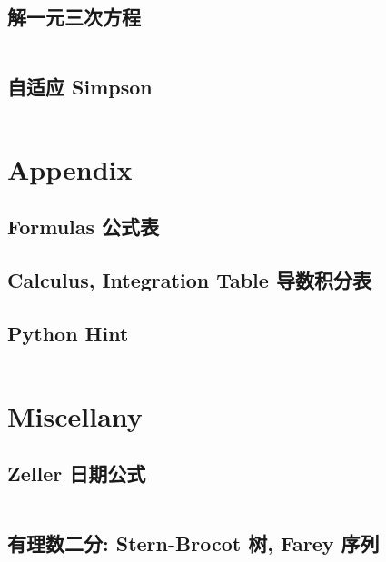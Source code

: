 \documentclass[titlepage, a4paper, 11pt]{article}
\begin{document}
\begin{spacing}{1.15}
				\subsection{解一元三次方程}
					\inputminted{cpp}{src/Math/解一元三次方程.cpp}
				\subsection{自适应 Simpson}
					\inputminted{cpp}{src/Math/Simpson.cpp}
		
			
			\section{Appendix}
				\begin{spacing}{0.4}
				\subsection{Formulas 公式表}
					
				\subsection{Calculus, Integration Table 导数积分表}
					
					
				\subsection{Python Hint}
					\inputminted{python}{src/Miscellany/py.py}
				\end{spacing}

			\section{Miscellany}
				\subsection{Zeller 日期公式}
					\inputminted{cpp}{src/Miscellany/日期公式.cpp}
				\subsection{有理数二分: Stern-Brocot 树, Farey 序列}
					\inputminted{python}{src/yzh/farey.py}

\end{spacing}
\end{document}
